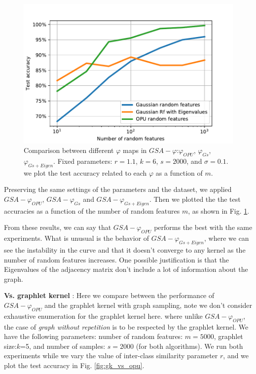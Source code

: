 \begin{figure}[H]
\centering
\includegraphics[scale=0.5]{figs/phi_comparison.pdf}
\caption[Comparison between different $\varphi$ maps in $GSA-\varphi$]{Comparison between different $\varphi$ maps in $GSA-\varphi$:$\varphi_{OPU}$, $\varphi_{Gs}$, $\varphi_{Gs+Eigen}$. Fixed parameters: $r=1.1$, $k=6$,  $s=2000$, and $\sigma=0.1$. we plot the test accuracy related to each $\varphi$ as a function of $m$.}
\label{fig:phi_comparison}
\end{figure}
Preserving the same settings of the parameters and the dataset, we applied $GSA-\varphi_{OPU}$, $GSA-\varphi_{Gs}$ and $GSA-\varphi_{Gs+Eigen}$. Then we plotted the the test accuracies as a  function of the number of random features $m$, as shown in Fig. \ref{fig:phi_comparison}.

From these results, we can say that $GSA-\varphi_{OPU}$ performs the best with the same experiments. What is unusual is the behavior of $GSA-\varphi_{Gs+Eigen}$, where we can see the instability in the curve and that it doesn't converge to any kernel as the number of random features increases. One possible justification is that the Eigenvalues of the adjacency matrix don't include a lot of information about the graph.

\textbf{ Vs. graphlet kernel} :
Here we compare between the performance of $GSA-\varphi_{OPU}$ and the graphlet kernel with graph sampling, note we don't consider exhaustive enumeration for the graphlet kernel here. where unlike  $GSA-\varphi_{OPU}$, the  case of \emph{graph without repetition} is to be respected by the graphlet kernel.
We have the following parameters: number of random features: $m=5000$, graphlet size:$k$=5, and number of samples: $s=2000$ (for both algorithms). We run both experiments while we vary the value of inter-class similarity parameter $r$, and we plot the test accuracy in Fig. \ref{fig:gk_vs_opu}.

